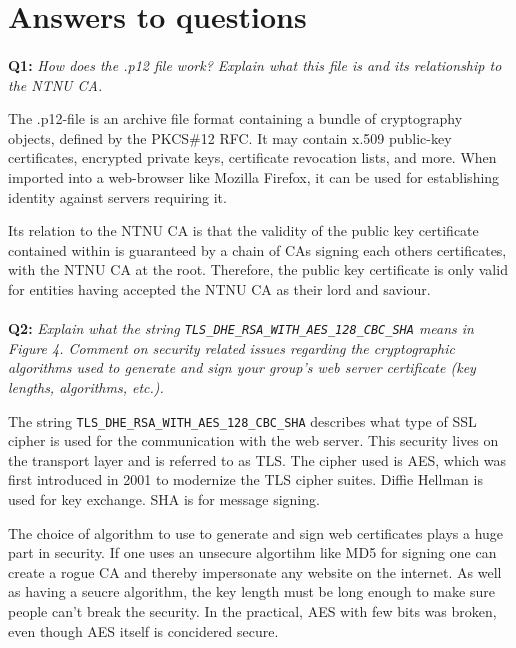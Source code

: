 \section{Answers to questions}

\paragraph{}
\textbf{Q1:}
\textit{How does the .p12 file work? Explain what this file is and its relationship to the NTNU CA.}

The .p12-file is an archive file format containing a bundle of cryptography objects, defined by the PKCS\#12 RFC\cite{pkcs-12}.
It may contain x.509 public-key certificates\cite{x509}, encrypted private keys, certificate revocation lists, and more.
When imported into a web-browser like Mozilla Firefox, it can be used for establishing identity against servers requiring it.

Its relation to the NTNU CA is that the validity of the public key certificate contained within is guaranteed by a chain of CAs signing each others certificates, with the NTNU CA at the root.
Therefore, the public key certificate is only valid for entities having accepted the NTNU CA as their lord and saviour.

\paragraph{}
\textbf{Q2:}
\cprotect\textit{Explain what the string \verb/TLS_DHE_RSA_WITH_AES_128_CBC_SHA/ means in Figure 4. Comment on security related issues regarding the cryptographic algorithms used to generate and sign your group's web server certificate (key lengths, algorithms, etc.).}

The string \verb/TLS_DHE_RSA_WITH_AES_128_CBC_SHA/ describes what type of SSL cipher is used for the communication with the web server.
This security lives on the transport layer and is referred to as TLS.
The cipher used is AES, which was first introduced in 2001\cite{rfc3268} to modernize the TLS cipher suites.
Diffie Hellman is used for key exchange.
SHA is for message signing.

The choice of algorithm to use to generate and sign web certificates plays a huge part in security.
If one uses an unsecure algortihm like MD5 for signing one can create a rogue CA and thereby impersonate any website on the internet\cite{md5-harmful}.
As well as having a seucre algorithm, the key length must be long enough to make sure people can't break the security.
In the practical, AES with few bits was broken, even though AES itself is concidered secure\cite{nsa-secure}.

